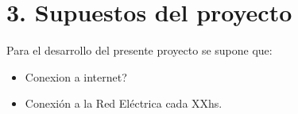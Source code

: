 \section{3. Supuestos del proyecto}
\label{sec:supuestos}


Para el desarrollo del presente proyecto se supone que:
\begin{itemize}
  \item Conexion a internet?
  \item Conexión a la Red Eléctrica cada XXhs.
\end{itemize}